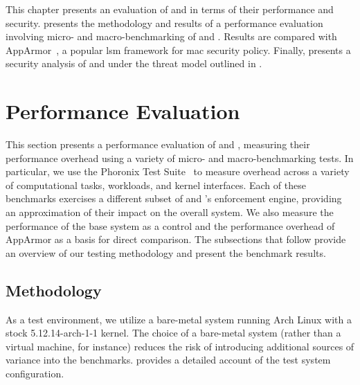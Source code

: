 This chapter presents an evaluation of \bpfbox{} and \bpfcontain{} in terms of their
performance and security.  presents the methodology and results
of a performance evaluation involving micro- and macro-benchmarking of \bpfbox{} and
\bpfcontain{}. Results are compared with AppArmor~\cite{cowan2000_apparmor}, a popular
\gls{lsm} framework for \gls{mac} security policy. Finally, 
presents a security analysis of \bpfbox{} and \bpfcontain{} under the threat model
outlined in .

\section{Performance Evaluation}%
\label{s:eval-performance}

This section presents a performance evaluation of \bpfbox{} and \bpfcontain{}, measuring
their performance overhead using a variety of micro- and macro-benchmarking tests. In
particular, we use the Phoronix Test Suite~\cite{phoronix} to measure overhead across
a variety of computational tasks, workloads, and kernel interfaces. Each of these
benchmarks exercises a different subset of \bpfbox{} and \bpfcontain{}'s enforcement
engine, providing an approximation of their impact on the overall system. We also measure
the performance of the base system as a control and the performance overhead of AppArmor
as a basis for direct comparison. The subsections that follow provide an overview of our
testing methodology and present the benchmark results.

\subsection{Methodology}%
\label{ss:eval-methodology}

As a test environment, we utilize a bare-metal system running Arch Linux with a stock
5.12.14-arch-1-1 kernel. The choice of a bare-metal system (rather than a virtual machine,
for instance) reduces the risk of introducing additional sources of variance into the
benchmarks.  provides a detailed account of the test system
configuration.

